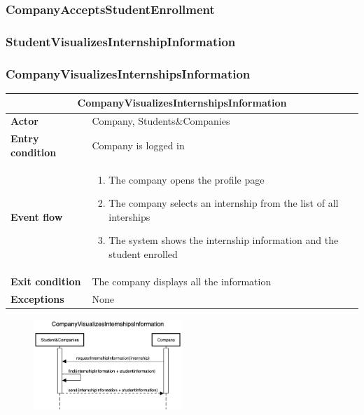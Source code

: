 \subsubsection{CompanyAcceptsStudentEnrollment}

\subsubsection{StudentVisualizesInternshipInformation}

\subsubsection{CompanyVisualizesInternshipsInformation}

\begin{table}[H]
    \centering
    \begin{tabular}{|l|m{10cm}|}
        \hline \multicolumn{2}{|c|}{\textbf{CompanyVisualizesInternshipsInformation}} \\
        \hline \textbf{Actor} & Company, Students\&Companies \\
        \hline \textbf{Entry condition} & Company is logged in \\
        \hline \textbf{Event flow} &
        \begin{enumerate}
            \item The company opens the profile page
            \item The company selects an internship from the list of all interships
            \item The system shows the internship information and the student enrolled
        \end{enumerate}
        \\
        \hline \textbf{Exit condition} & The company displays all the information \\
        \hline \textbf{Exceptions} & None \\
        \hline
    \end{tabular}
\end{table}

\begin{figure}[H]
    \centering
    \includegraphics[width=0.5\textwidth]{../../assets/sequence-diagrams/CompanyVisualizesInternshipsInformation.png}
\end{figure}


